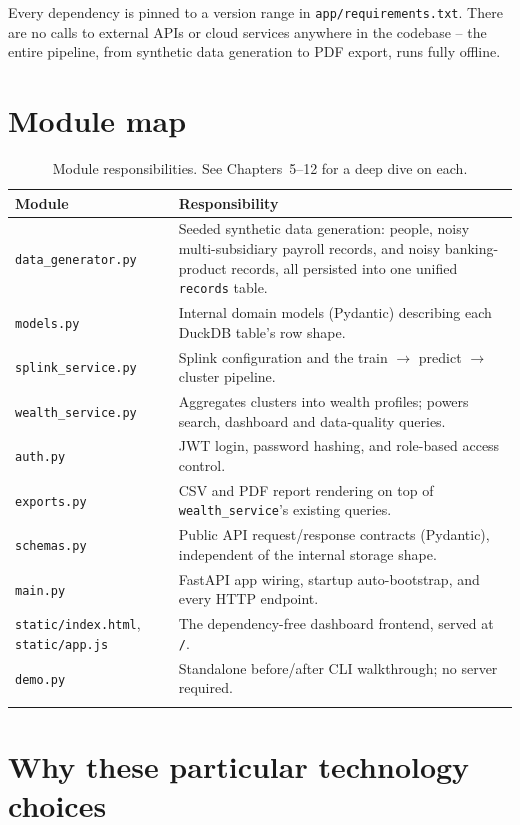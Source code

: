 \documentclass[11pt]{report}
\begin{document}
\begin{engbox}
Every dependency is pinned to a version range in \texttt{app/requirements.txt}. There are no calls to external APIs or cloud services anywhere in the codebase -- the entire pipeline, from synthetic data generation to PDF export, runs fully offline.
\end{engbox}

\section{Module map}

\begin{longtable}{@{}p{3.6cm}p{9.7cm}@{}}
\toprule
\textbf{Module} & \textbf{Responsibility} \\
\midrule
\endhead
\texttt{data\_generator.py} & Seeded synthetic data generation: people, noisy multi-subsidiary payroll records, and noisy banking-product records, all persisted into one unified \texttt{records} table. \\
\texttt{models.py} & Internal domain models (Pydantic) describing each DuckDB table's row shape. \\
\texttt{splink\_service.py} & Splink configuration and the train $\to$ predict $\to$ cluster pipeline. \\
\texttt{wealth\_service.py} & Aggregates clusters into wealth profiles; powers search, dashboard and data-quality queries. \\
\texttt{auth.py} & JWT login, password hashing, and role-based access control. \\
\texttt{exports.py} & CSV and PDF report rendering on top of \texttt{wealth\_service}'s existing queries. \\
\texttt{schemas.py} & Public API request/response contracts (Pydantic), independent of the internal storage shape. \\
\texttt{main.py} & FastAPI app wiring, startup auto-bootstrap, and every HTTP endpoint. \\
\texttt{static/index.html}, \texttt{static/app.js} & The dependency-free dashboard frontend, served at \texttt{/}. \\
\texttt{demo.py} & Standalone before/after CLI walkthrough; no server required. \\
\bottomrule
\caption{Module responsibilities. See Chapters~5--12 for a deep dive on each.}
\end{longtable}

\section{Why these particular technology choices}
\end{document}
